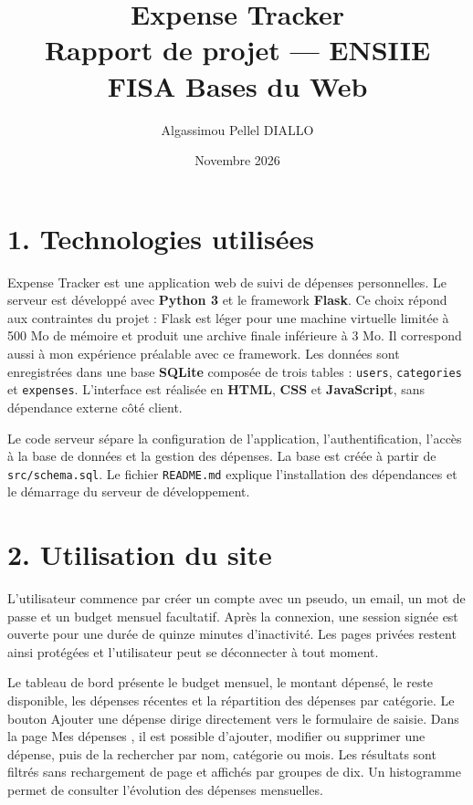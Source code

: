 \documentclass[11pt,a4paper]{article}
\title{\vspace{-1.4cm}\textbf{Expense Tracker}\\\large Rapport de projet --- ENSIIE FISA Bases du Web}
\author{Algassimou Pellel DIALLO}
\date{Novembre 2026}
\begin{document}
\maketitle
\thispagestyle{empty}

\section*{1. Technologies utilisées}
Expense Tracker est une application web de suivi de dépenses personnelles. Le serveur est développé avec \textbf{Python 3} et le framework \textbf{Flask}. Ce choix répond aux contraintes du projet : Flask est léger pour une machine virtuelle limitée à 500 Mo de mémoire et produit une archive finale inférieure à 3 Mo. Il correspond aussi à mon expérience préalable avec ce framework. Les données sont enregistrées dans une base \textbf{SQLite} composée de trois tables : \texttt{users}, \texttt{categories} et \texttt{expenses}. L'interface est réalisée en \textbf{HTML}, \textbf{CSS} et \textbf{JavaScript}, sans dépendance externe côté client.

Le code serveur sépare la configuration de l'application, l'authentification, l'accès à la base de données et la gestion des dépenses. La base est créée à partir de \texttt{src/schema.sql}. Le fichier \texttt{README.md} explique l'installation des dépendances et le démarrage du serveur de développement.

\section*{2. Utilisation du site}
L'utilisateur commence par créer un compte avec un pseudo, un email, un mot de passe et un budget mensuel facultatif. Après la connexion, une session signée est ouverte pour une durée de quinze minutes d'inactivité. Les pages privées restent ainsi protégées et l'utilisateur peut se déconnecter à tout moment.

Le tableau de bord présente le budget mensuel, le montant dépensé, le reste disponible, les dépenses récentes et la répartition des dépenses par catégorie. Le bouton \og Ajouter une dépense \fg{} dirige directement vers le formulaire de saisie. Dans la page \og Mes dépenses \fg{}, il est possible d'ajouter, modifier ou supprimer une dépense, puis de la rechercher par nom, catégorie ou mois. Les résultats sont filtrés sans rechargement de page et affichés par groupes de dix. Un histogramme permet de consulter l'évolution des dépenses mensuelles.
\end{document}

